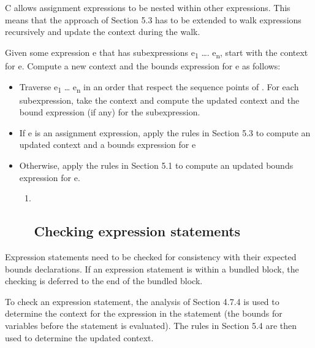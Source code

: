 \documentclass[]{article}
\begin{document}
C allows assignment expressions to be nested within other expressions.
This means that the approach of Section 5.3 has to be extended to walk
expressions recursively and update the context during the walk.

Given some expression e that has subexpressions e\textsubscript{1}
\ldots{}. e\textsubscript{n}, start with the context for e. Compute a
new context and the bounds expression for e as follows:

\begin{itemize}
\item
  Traverse e\textsubscript{1} \ldots{} e\textsubscript{n} in an order
  that respect the sequence points of . For each subexpression, take the
  context and compute the updated context and the bound expression (if
  any) for the subexpression.
\item
  If e is an assignment expression, apply the rules in Section 5.3 to
  compute an updated context and a bounds expression for e
\item
  Otherwise, apply the rules in Section 5.1 to compute an updated bounds
  expression for e.

  \begin{enumerate}
  \def\labelenumi{\arabic{enumi}.}
  \item ~
    \subsection{\texorpdfstring{\protect\hypertarget{ux5fRef426463204}{}{\protect\hypertarget{ux5fRef426627078}{}{\protect\hypertarget{ux5fRef426635963}{}{\protect\hypertarget{ux5fRef426636220}{}{\protect\hypertarget{ux5fRef426636873}{}{\protect\hypertarget{ux5fRef426637951}{}{\protect\hypertarget{ux5fToc426641085}{}{\protect\hypertarget{ux5fToc435434960}{}{\protect\hypertarget{ux5fToc437460787}{}{\protect\hypertarget{ux5fToc440445466}{}{\protect\hypertarget{ux5fToc440449248}{}{\protect\hypertarget{ux5fToc440551898}{}{}}}}}}}}}}}}Checking
    expression
    statements}{Checking expression statements}}\label{checking-expression-statements}
  \end{enumerate}
\end{itemize}

Expression statements need to be checked for consistency with their
expected bounds declarations. If an expression statement is within a
bundled block, the checking is deferred to the end of the bundled block.

To check an expression statement, the analysis of Section 4.7.4 is used
to determine the context for the expression in the statement (the bounds
for variables before the statement is evaluated). The rules in Section
5.4 are then used to determine the updated context.
\end{document}
